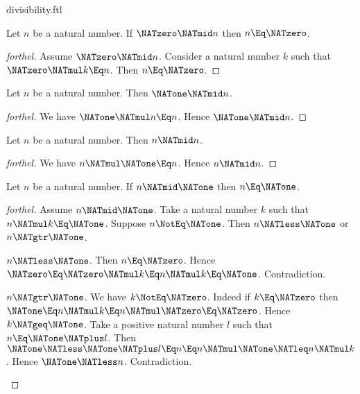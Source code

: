 \documentclass{stex}
\begin{document}
\begin{smodule}{divisibility.ftl}
\begin{proposition}[forthel]
  Let $n$ be a natural number.
  If $\NATzero \NATmid n$ then $n \Eq \NATzero$.
\end{proposition}
\begin{proof}[forthel]
  Assume $\NATzero \NATmid n$.
  Consider a natural number $k$ such that $\NATzero \NATmul k \Eq n$.
  Then $n \Eq \NATzero$.
\end{proof}

\begin{proposition}[forthel]
  Let $n$ be a natural number.
  Then $\NATone \NATmid n$.
\end{proposition}
\begin{proof}[forthel]
  We have $\NATone \NATmul n \Eq n$.
  Hence $\NATone \NATmid n$.
\end{proof}

\begin{proposition}[forthel]
  Let $n$ be a natural number.
  Then $n \NATmid n$.
\end{proposition}
\begin{proof}[forthel]
  We have $n \NATmul \NATone \Eq n$.
  Hence $n \NATmid n$.
\end{proof}

\begin{proposition}[forthel]
  Let $n$ be a natural number.
  If $n \NATmid \NATone$ then $n \Eq \NATone$.
\end{proposition}
\begin{proof}[forthel]
  Assume $n \NATmid \NATone$.
  Take a natural number $k$ such that $n \NATmul k \Eq \NATone$.
  Suppose $n \NotEq \NATone$.
  Then $n \NATless \NATone$ or $n \NATgtr \NATone$.

  \begin{case}{$n \NATless \NATone$.}
    Then $n \Eq \NATzero$.
    Hence $\NATzero
      \Eq \NATzero \NATmul k
      \Eq n \NATmul k
      \Eq \NATone$.
    Contradiction.
  \end{case}

  \begin{case}{$n \NATgtr \NATone$.}
    We have $k \NotEq \NATzero$.
    Indeed if $k \Eq \NATzero$ then
    $\NATone
      \Eq n \NATmul k
      \Eq n \NATmul \NATzero
      \Eq \NATzero$.
    Hence $k \NATgeq \NATone$.
    Take a positive natural number $l$ such that $n \Eq \NATone \NATplus l$.
    Then $\NATone
      \NATless \NATone \NATplus l
      \Eq n
      \Eq n \NATmul \NATone
      \NATleq n \NATmul k$.
    Hence $\NATone \NATless n$.
    Contradiction.
  \end{case}
\end{proof}


\end{smodule}
\end{document}

